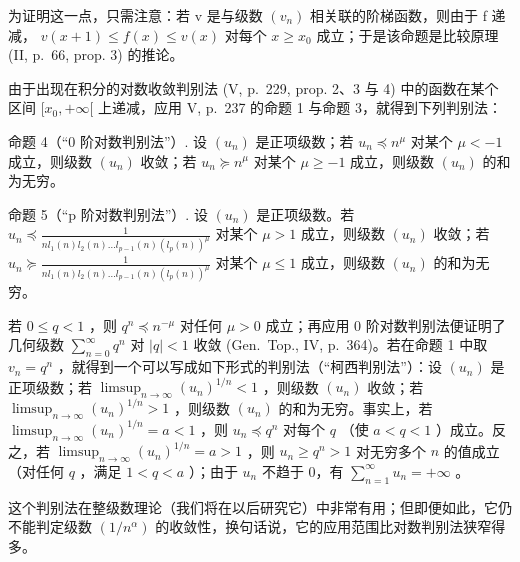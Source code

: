 为证明这一点，只需注意：若 v 是与级数 \((v_{n})\) 相关联的阶梯函数，则由于 f 递减， \(v(x+1) \leqslant f(x) \leqslant v(x)\) 对每个 \(x \geqslant x_{0}\) 成立；于是该命题是比较原理 (II, p.~66, prop. 3) 的推论。

由于出现在积分的对数收敛判别法 (V, p.~229, prop. 2、3 与 4) 中的函数在某个区间 \([x_{0}, +\infty[\) 上递减，应用 V, p.~237 的命题 1 与命题 3，就得到下列判别法：

命题 4（“0 阶对数判别法”）. 设 \((u_{n})\) 是正项级数；若 \(u_{n} \preccurlyeq n^{\mu}\) 对某个 \(\mu < -1\) 成立，则级数 \((u_{n})\) 收敛；若 \(u_{n} \succcurlyeq n^{\mu}\) 对某个 \(\mu \geqslant -1\) 成立，则级数 \((u_{n})\) 的和为无穷。

命题 5（“p 阶对数判别法”）. 设 \((u_{n})\) 是正项级数。若 \(u_{n} \preccurlyeq \frac{1}{nl_{1}(n)l_{2}(n)\ldots l_{p-1}(n)(l_{p}(n))^{\mu}}\) 对某个 \(\mu > 1\) 成立，则级数 \((u_{n})\) 收敛；若 \(u_{n} \succcurlyeq \frac{1}{nl_{1}(n)l_{2}(n)\ldots l_{p-1}(n)(l_{p}(n))^{\mu}}\) 对某个 \(\mu \leqslant 1\) 成立，则级数 \((u_{n})\) 的和为无穷。

若 \(0 \leqslant q < 1\) ，则 \(q^n \preccurlyeq n^{-\mu}\) 对任何 \(\mu > 0\) 成立；再应用 0 阶对数判别法便证明了几何级数 \(\sum_{n=0}^{\infty} q^n\) 对 \(|q| < 1\) 收敛 (Gen.~Top., IV, p.~364)。若在命题 1 中取 \(v_n = q^n\) ，就得到一个可以写成如下形式的判别法（“柯西判别法”）：设 \((u_n)\) 是正项级数；若 \(\limsup_{n \to \infty} (u_n)^{1/n} < 1\) ，则级数 \((u_n)\) 收敛；若 \(\limsup_{n \to \infty} (u_n)^{1/n} > 1\) ，则级数 \((u_n)\) 的和为无穷。事实上，若 \(\limsup_{n \to \infty} (u_n)^{1/n} = a < 1\) ，则 \(u_n \preccurlyeq q^n\) 对每个 \(q\) （使 \(a < q < 1\) ）成立。反之，若 \(\limsup_{n \to \infty} (u_n)^{1/n} = a > 1\) ，则 \(u_n \geqslant q^n > 1\) 对无穷多个 \(n\) 的值成立（对任何 \(q\) ，满足 \(1 < q < a\) ）；由于 \(u_n\) 不趋于 0，有 \(\sum_{n=1}^{\infty} u_n = +\infty\) 。

这个判别法在整级数理论（我们将在以后研究它）中非常有用；但即便如此，它仍不能判定级数 \((1/n^{\alpha})\) 的收敛性，换句话说，它的应用范围比对数判别法狭窄得多。

